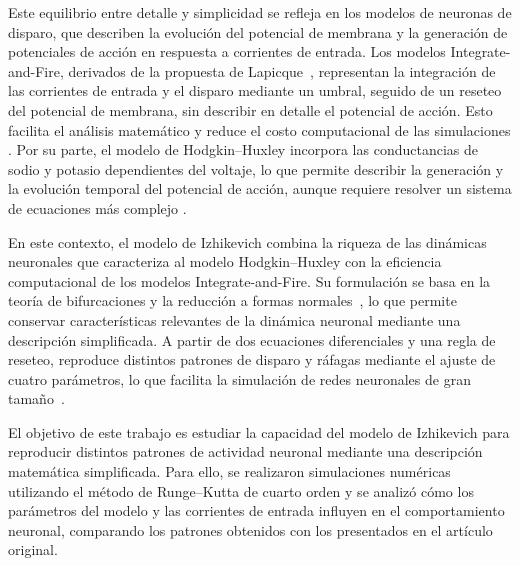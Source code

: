\documentclass[10pt,a4paper,twocolumn]{article}
\begin{document}
Este equilibrio entre detalle y simplicidad se refleja en los modelos de neuronas de
disparo, que describen la evolución del potencial de membrana y la generación de
potenciales de acción en respuesta a corrientes de entrada. Los modelos
Integrate-and-Fire, derivados de la propuesta de Lapicque~\cite{lapicque1907}, representan la
integración de las corrientes de entrada y el disparo mediante un umbral, seguido de
un reseteo del potencial de membrana, sin describir en detalle el potencial de
acción. Esto facilita el análisis matemático y reduce el costo computacional de las
simulaciones \cite{dayan2001}. Por su parte, el modelo de Hodgkin--Huxley
incorpora las conductancias de sodio y potasio dependientes del voltaje, lo que
permite describir la generación y la evolución temporal del potencial de acción,
aunque requiere resolver un sistema de ecuaciones más complejo \cite{hodgkin1952}.

En este contexto, el modelo de Izhikevich combina la riqueza de las dinámicas
neuronales que caracteriza al modelo Hodgkin--Huxley con la eficiencia computacional
de los modelos Integrate-and-Fire. Su formulación se basa en la teoría de
bifurcaciones y la reducción a formas normales~\cite{izhikevich2003,izhikevich2007}, lo que permite conservar
características relevantes de la dinámica neuronal mediante una descripción
simplificada. A partir de dos ecuaciones diferenciales y una regla de reseteo,
reproduce distintos patrones de disparo y ráfagas mediante el ajuste de cuatro
parámetros, lo que facilita la simulación de redes neuronales de gran tamaño~\cite{izhikevich2003}.

El objetivo de este trabajo es estudiar la capacidad del modelo de Izhikevich para
reproducir distintos patrones de actividad neuronal mediante una descripción
matemática simplificada. Para ello, se realizaron simulaciones numéricas utilizando
el método de Runge--Kutta de cuarto orden y se analizó cómo los parámetros del modelo
y las corrientes de entrada influyen en el comportamiento neuronal, comparando los
patrones obtenidos con los presentados en el artículo original.
\end{document}
